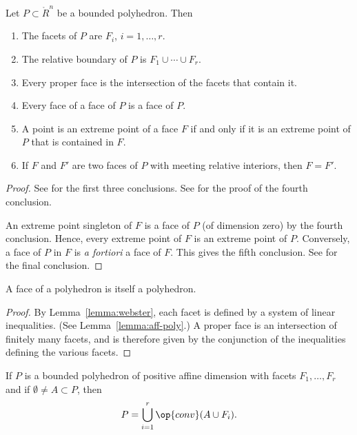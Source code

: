 \begin{lemma}[]\cutrate{}\label{lemma:webster}  
Let $P\subset\ring{R}^n$ be a bounded polyhedron.  Then
%
\begin{enumerate}
\item The facets of $P$ are $F_i$, $i=1,\ldots,r$.
\item The relative boundary of $P$ is $F_1\cup\cdots \cup F_r$.
\item Every proper face is the intersection of the facets that contain it.
\item Every face of a face of $P$ is a face of $P$.
\item A point is an extreme point of a face $F$ if and only if it is an extreme point of $P$
that is contained in $F$.
\item If $F$ and $F'$ are two faces of $P$ with meeting relative interiors, then $F=F'$.
\end{enumerate}
\end{lemma}
%
%
%

\begin{proof} See \cite[Thm~3.2.1]{webster:1994} for the first three
conclusions.  See \cite[Th~2.6.5]{webster:1994} for the proof of the
fourth conclusion.

An extreme point singleton of $F$ is a face of $P$ (of
dimension zero) by the fourth conclusion.  Hence, every extreme point of $F$
is an extreme point of $P$.  Conversely, a face of $P$ in $F$ is {\it a
fortiori} a face of $F$.  This gives the fifth conclusion.
See \cite[Cor~2.6.7]{webster:1994} for the final conclusion.
\end{proof}

\begin{corollary}\cutrate{}
A face of a polyhedron is itself a polyhedron.  
\end{corollary}

\begin{proof} By Lemma~\ref{lemma:webster}, each facet is defined by a
system of linear inequalities.  (See Lemma~\ref{lemma:aff-poly}.)  A
proper face is an intersection of finitely many facets, and is
therefore given by the conjunction of the inequalities defining the
various facets.
\end{proof}

\begin{lemma}[]\label{lemma:facet-partition}
  If $P$ is a bounded polyhedron of positive affine dimension with
  facets $F_1,\ldots,F_r$ and if $\emptyset\ne A\subset P$, then
\[ 
P = \bigcup_{i=1}^r \op{conv}(A\cup F_i).
\] 
\end{lemma}

